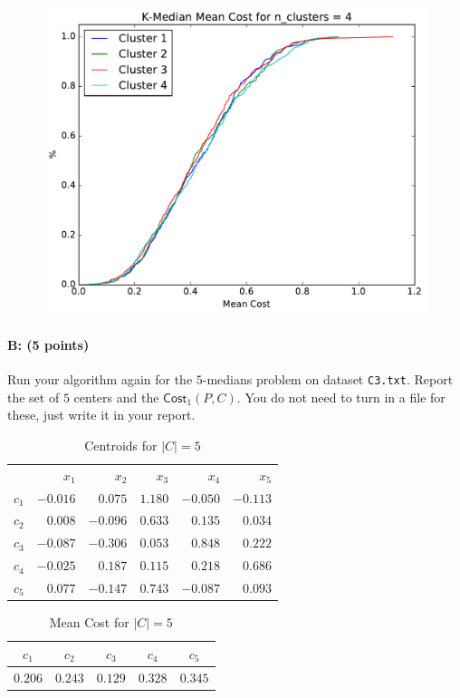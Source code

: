 \documentclass[11pt]{article}
\begin{document}
\begin{figure}[H]
\centering
\includegraphics[width=.75\textwidth]{cdf_median_n-4.pdf}
\end{figure}



\paragraph{B: (5 points)}
Run your algorithm again for the $5$-medians problem on dataset \texttt{C3.txt}.  Report the set of $5$ centers and the $\textsf{Cost}_1(P,C)$.  You do not need to turn in a file for these, just write it in your report.  

\begin{table}[H]
\centering
\caption{Centroids for $\left| C \right| = 5$}
\begin{tabular}{c | r r r r r}
\hline\hline
 & $x_{1}$ & $x_{2}$ & $x_{3}$ & $x_{4}$ & $x_{5}$\\
$c_{1}$ & $-0.016$ & $0.075$ & $1.180$ & $-0.050$ & $-0.113$\\
$c_{2}$ & $0.008$ & $-0.096$ & $0.633$ & $0.135$ & $0.034$\\
$c_{3}$ & $-0.087$ & $-0.306$ & $0.053$ & $0.848$ & $0.222$\\
$c_{4}$ & $-0.025$ & $0.187$ & $0.115$ & $0.218$ & $0.686$\\
$c_{5}$ & $0.077$ & $-0.147$ & $0.743$ & $-0.087$ & $0.093$\\
\hline
\end{tabular}
\end{table}


\begin{table}[H]
\centering
\caption{Mean Cost for $\left| C \right| = 5$}
\begin{tabular}{c c c c c}
\hline\hline
$c_{1}$ & $c_{2}$ & $c_{3}$ & $c_{4}$ & $c_{5}$\\
\hline
$0.206$ & $0.243$ & $0.129$ & $0.328$ & $0.345$\\
\hline
\end{tabular}
\end{table}
\end{document}
